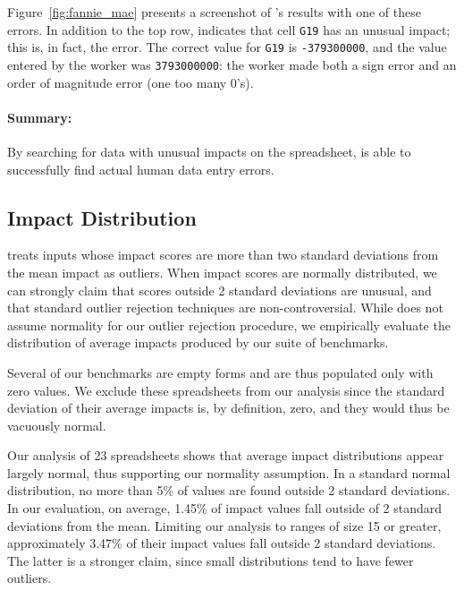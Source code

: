 Figure~\ref{fig:fannie_mae} presents a screenshot of \checkcell{}'s
results with one of these errors. In addition to the top
row, \checkcell{} indicates that cell \texttt{G19} has an unusual
impact; this is, in fact, the error. The correct value
for \texttt{G19} is \texttt{-379300000}, and the value entered by the
worker was \texttt{3793000000}: the worker made both a sign error and
an order of magnitude error (one too many 0's).

\paragraph{Summary:} By searching for data with unusual impacts on the spreadsheet, \checkcell{} is able to successfully find actual human data entry errors.

\subsection{Impact Distribution}
\label{sec:impact_normal}

\checkcell{} treats inputs whose impact scores are more than two standard deviations from the mean impact as outliers.  When impact scores are normally distributed, we can strongly claim that scores outside 2 standard deviations are unusual, and that standard outlier rejection techniques are non-controversial.  While \checkcell{} does not assume normality for our outlier rejection procedure, we empirically evaluate the distribution of average impacts produced by our suite of benchmarks.

Several of our benchmarks are empty forms and are thus populated only with zero values.  We exclude these spreadsheets from our analysis since the standard deviation of their average impacts is, by definition, zero, and they would thus be vacuously normal.

Our analysis of 23 spreadsheets shows that average impact distributions appear largely normal, thus supporting our normality assumption.  In a standard normal distribution, no more than 5\% of values are found outside 2 standard deviations.  In our evaluation, on average, 1.45\% of impact values fall outside of 2 standard deviations from the mean.  Limiting our analysis to ranges of size 15 or greater, approximately 3.47\% of their impact values fall outside 2 standard deviations.  The latter is a stronger claim, since small distributions tend to have fewer outliers.

